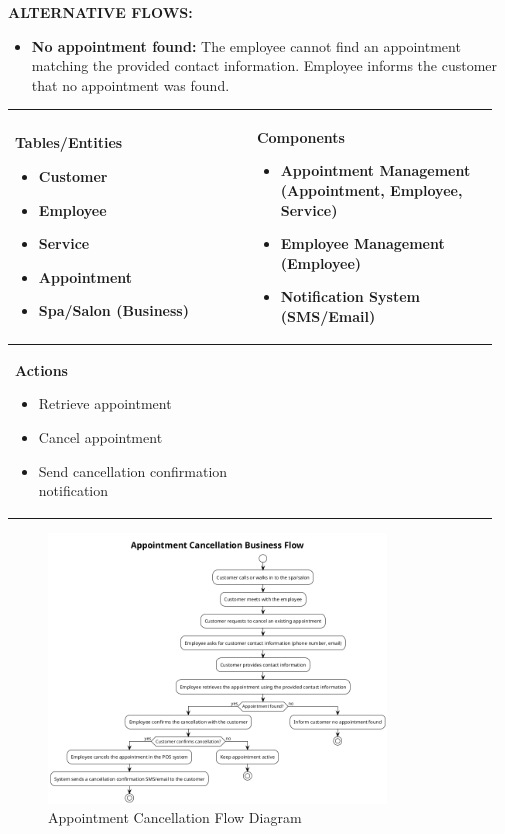 \documentclass[]{VUMIFTemplateClass}
\newenvironment{mpitemlist}[1][\linewidth]{%
    \begin{minipage}[t]{#1}%
        \setlength{\leftmargini}{12pt}%
        \begin{itemize}%
            \setlength{\itemsep}{1pt}%
            \setlength{\parskip}{0pt}%
            \setlength{\parsep}{0pt}%
}{%
        \end{itemize}%
    \end{minipage}\newline
}
\begin{document}
\textbf{ALTERNATIVE FLOWS:}
\begin{itemize}
    \item \textbf{No appointment found: } The employee cannot find an appointment matching the provided contact information.
    Employee informs the customer that no appointment was found.
\end{itemize}


\begin{center}
\setlength{\tabcolsep}{8pt}
\begin{tabular}{|p{0.48\linewidth}|p{0.48\linewidth}|}
\hline
\textbf{Tables/Entities} \newline
\begin{mpitemlist}
\item Customer
\item Employee
\item Service
\item Appointment
\item Spa/Salon (Business)
\end{mpitemlist}
&
\textbf{Components} \newline
\begin{mpitemlist}
\item Appointment Management (Appointment, Employee, Service)
\item Employee Management (Employee)
\item Notification System (SMS/Email)
\end{mpitemlist}
\\ \hline
\textbf{Actions} \newline
\begin{mpitemlist}
\item Retrieve appointment
\item Cancel appointment
\item Send cancellation confirmation notification
\end{mpitemlist}
&

\\ \hline
\end{tabular}
\end{center}

\begin{figure}[H]
    \centering
    \includegraphics[width=0.8\textwidth]{images/diagrams/services/appointment_cancellation_flow.png}
    \caption{Appointment Cancellation Flow Diagram}
    \label{fig:appointment_cancellation_flow}
\end{figure}
\end{document}
